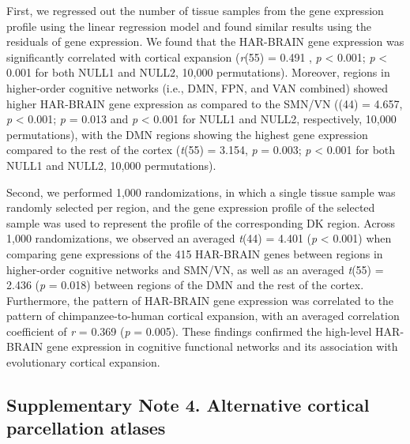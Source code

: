 \begin{refsection}
First, we regressed out the number of tissue samples from the gene expression profile using the linear regression model and found similar results using the residuals of gene expression. We found that the HAR-BRAIN gene expression was significantly correlated with cortical expansion (\textit{r}(55) = 0.491 , \textit{p} < 0.001; \textit{p} < 0.001 for both NULL1 and NULL2, 10,000 permutations). Moreover, regions in higher-order cognitive networks (i.e., DMN, FPN, and VAN combined) showed higher HAR-BRAIN gene expression as compared to the SMN/VN (\tvaldf(44) = 4.657, \textit{p} < 0.001; \textit{p} = 0.013 and \textit{p} < 0.001 for NULL1 and NULL2, respectively, 10,000 permutations), with the DMN regions showing the highest gene expression compared to the rest of the cortex (\textit{t}(55) = 3.154, \textit{p} = 0.003; \textit{p} < 0.001 for both NULL1 and NULL2, 10,000 permutations).

Second, we performed 1,000 randomizations, in which a single tissue sample was randomly selected per region, and the gene expression profile of the selected sample was used to represent the profile of the corresponding DK region. Across 1,000 randomizations, we observed an averaged \textit{t}(44) = 4.401 (\textit{p} < 0.001) when comparing gene expressions of the 415 HAR-BRAIN genes between regions in higher-order cognitive networks and SMN/VN, as well as an averaged \textit{t}(55) = 2.436 (\textit{p} = 0.018) between regions of the DMN and the rest of the cortex. Furthermore, the pattern of HAR-BRAIN gene expression was correlated to the pattern of chimpanzee-to-human cortical expansion, with an averaged correlation coefficient of \textit{r} = 0.369 (\textit{p} = 0.005). These findings confirmed the high-level HAR-BRAIN gene expression in cognitive functional networks and its association with evolutionary cortical expansion.

\subsection*{Supplementary Note 4. Alternative cortical parcellation atlases}

\end{refsection}
